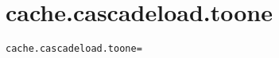 \section{cache.cascadeload.toone}
\label{configuration:CacheCascadeloadToone}
\ClearAPI
\TODO
{}
\begin{lstlisting}[style=Props,caption={Usage example for \textit{cache.cascadeload.toone}}]
cache.cascadeload.toone=
\end{lstlisting}